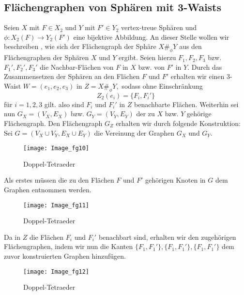 \documentclass[12pt,titlepage,twoside,cleardoublepage]{article}
\theoremstyle{nummermitklammern}
\numberwithin{equation}{section}
\begin{document}
\subsection{Flächengraphen von Sphären mit 3-Waists}
Seien $X$ mit $F\in X_2$ und $Y$ mit $F'\in Y_2$ vertex-treue Sphären  und $\phi:X_2(F)\to Y_2(F')$ eine bijektive Abbildung. An dieser Stelle wollen wir beschreiben , wie sich der Flächengraph der Sphäre $X\#_{\phi}Y$ aus den Flächengraphen der Sphären $X$ und $Y$ ergibt. Seien hierzu $F_1,F_2,F_3$ bzw. $F_1',F_2',F_3'$ die Nachbar-Flächen von $F$ in $X$ bzw. von $F'$ in $Y.$ Durch das Zusammensetzen der Sphären an den Flächen $F$ und $F'$ erhalten wir einen 3-Waist $W=(e_1,e_2,e_3)$ in $Z=X\#_\phi Y,$ sodass ohne Einschränkung 
\[
Z_2(e_i)=\{F_i,F_i'\}
\] für $i=1,2,3$ gilt. also sind $F_i$ und $F_i'$ in $Z$ benachbarte Flächen. Weiterhin sei nun $G_X=(V_X,E_X)$ bzw. $G_Y=(V_Y,E_Y)$ der zu $X$ bzw. $Y$ gehörige Flächengraph. Den Flächengraph $G_Z$ erhalten wir durch folgende Konstruktion:
Sei $G=(V_X\cup V_Y,E_X \cup E_Y)$ die Vereinung der Graphen $G_X$ und $G_Y.$
\begin{figure}[H]
\begin{center}
\texttt{[image: Image\_fg10]}
\end{center}
\caption{Doppel-Tetraeder}
\end{figure}
Als erstes müssen die zu den Flächen $F$ und $F'$ gehörigen Knoten in $G$ dem Graphen entnommen werden. 
\begin{figure}[H]
\begin{center}
\texttt{[image: Image\_fg11]}
\end{center}
\caption{Doppel-Tetraeder}
\end{figure}
Da in $Z$ die Flächen $F_i$ und $F_i'$ benachbart sind, erhalten wir den zugehörigen Flächengraphen, indem wir nun die Kanten $\{F_1,F_1'\},\{F_1,F_1'\},\{F_1,F_1'\}$ dem zuvor konstruierten Graphen hinzufügen. 
\begin{figure}[H]
\begin{center}
\texttt{[image: Image\_fg12]}
\end{center}
\caption{Doppel-Tetraeder}
\end{figure}
\end{document}

